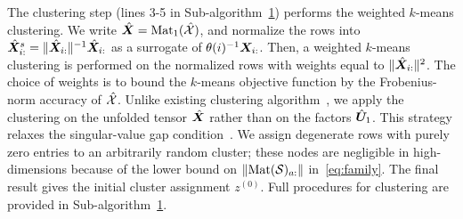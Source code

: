 \documentclass[journal]{IEEEtran}
\theoremstyle{definition}
\theoremstyle{definition}
\begin{document}
The clustering step (lines 3-5 in Sub-algorithm~\hyperref[alg:main]{1}) performs the weighted $k$-means clustering. 
We write $\hat {\bm X}=\text{Mat}_1(\hat {\mathcal{X}})$, and normalize the rows into $\hat {\bm X}^s_{i:}=\lVert\hat {\bm X}_{i:}\rVert^{-1}\hat {\bm X}_{i:}$ as a surrogate of $\theta(i)^{-1} \bm X_{i:}$. Then, a weighted $k$-means clustering is performed on the normalized rows with weights equal to $\lVert\hat {\bm X}_{i:}\rVert^2$. The choice of weights is to bound the $k$-means objective function by the Frobenius-norm accuracy of $\hat {\mathcal{X}}$. Unlike existing clustering algorithm~\citep{ke2019community}, we apply the clustering on the unfolded tensor $\hat {\bm X}$ rather than on the factors $\hat {\bm{U}}_1$. This strategy relaxes the singular-value gap condition~\citep{gao2018community, han2020exact}.
We assign degenerate rows with purely zero entries to an arbitrarily random cluster; these nodes are negligible in high-dimensions because of the lower bound on $\lVert\text{Mat}(\mathcal{S})_{a:}\rVert$ in~\eqref{eq:family}. The final result gives the initial cluster assignment $z^{(0)}$. Full procedures for clustering are provided in Sub-algorithm~\hyperref[alg:main]{1}. 
\end{document}
